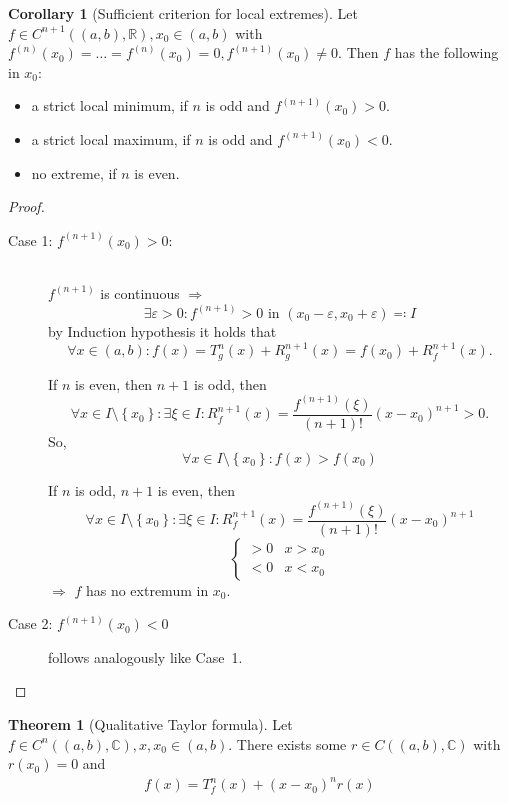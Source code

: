 \documentclass[a4paper,landscape,twocolumn]{article}
\theoremstyle{definition}
\newtheorem{theorem}{Theorem}
\newtheorem{cor}{Corollary}
\newcommand\set[1]{\left\{#1\right\}}
\begin{document}
\begin{cor}[Sufficient criterion for local extremes]
  Let $f \in C^{n+1}((a,b), \mathbb R), x_0 \in (a,b)$ with
  $f^{(n)}(x_0) = \ldots = f^{(n)}(x_0) = 0, f^{(n+1)}(x_0) \neq 0$.
  Then $f$ has the following in $x_0$:
  \begin{itemize}
    \item a strict local minimum, if $n$ is odd and $f^{(n+1)}(x_0) > 0$.
    \item a strict local maximum, if $n$ is odd and $f^{(n+1)}(x_0) < 0$.
    \item no extreme, if $n$ is even.
  \end{itemize}
\end{cor}
\begin{proof}
  \begin{description}
    \item[Case 1: $f^{(n+1)}(x_0) > 0$:] \hfill{} \\
      $f^{(n+1)}$ is continuous $\Rightarrow$
      \[ \exists \varepsilon > 0: f^{(n+1)} > 0 \text{ in } (x_0 - \varepsilon, x_0 + \varepsilon) \eqqcolon I \]
      by Induction hypothesis it holds that
      \[ \forall x \in (a,b): f(x) = T_g^n(x) + R_g^{n+1}(x) = f(x_0) + R_f^{n+1}(x). \]

      If $n$ is even, then $n+1$ is odd, then
      \[ \forall x \in I \setminus \set{x_0}: \exists \xi \in I: R_f^{n+1}(x) = \frac{f^{(n+1)}(\xi)}{(n+1)!} (x - x_0)^{n+1} > 0. \]
      So,
      \[ \forall x \in I \setminus \set{x_0}: f(x) > f(x_0) \]

      If $n$ is odd, $n+1$ is even, then
      \[ \forall x \in I \setminus \set{x_0}: \exists \xi \in I: R_f^{n+1}(x) = \frac{f^{(n+1)}(\xi)}{(n+1)!} (x - x_0)^{n+1} \]
      \[
        \begin{cases}
          >0 & x > x_0 \\
          <0 & x < x_0
        \end{cases}
      \]
      $\Rightarrow$ $f$ has no extremum in $x_0$.
    \item[Case 2: $f^{(n+1)}(x_0) < 0$] follows analogously like Case~1.
  \end{description}
\end{proof}
\begin{theorem}[Qualitative Taylor formula]
  Let $f \in C^n((a,b), \mathbb C), x, x_0 \in (a,b)$.
  There exists some $r \in C((a,b), \mathbb C)$ with $r(x_0) = 0$ and
  \begin{align} f(x) = T_f^n(x) + (x - x_0)^n r(x) \label{qtf} \end{align}
\end{theorem}
\end{document}
